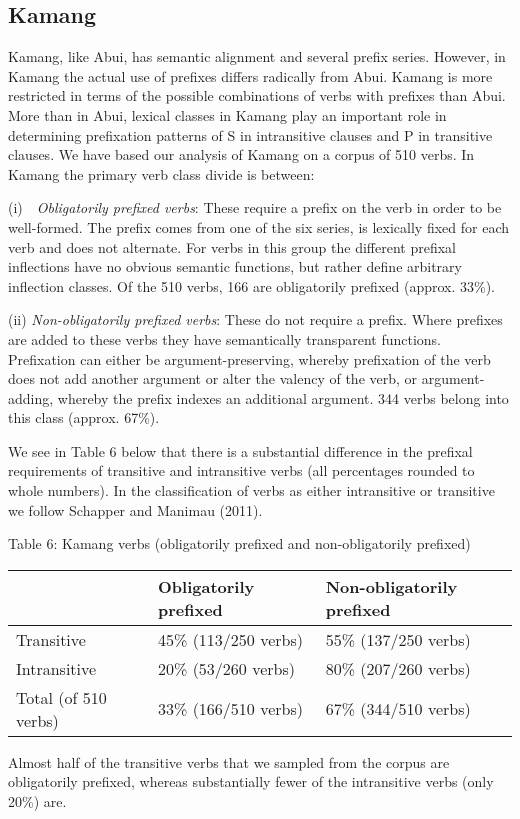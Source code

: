 \subsection[Kamang]{Kamang}
Kamang, like Abui, has semantic alignment and several prefix series. However, in Kamang the actual use of prefixes differs radically from Abui. Kamang is more restricted in terms of the possible combinations of verbs with prefixes than Abui. More than in Abui, lexical classes in Kamang play an important role in determining prefixation patterns of S in intransitive clauses and P in transitive clauses. We have based our analysis of Kamang on a corpus of 510 verbs. In Kamang the primary verb class divide is between: 

(i)\ \ \textit{Obligatorily prefixed verbs}: These require a prefix on the verb in order to be well-formed. The prefix comes from one of the six series, is lexically fixed for each verb and does not alternate. For verbs in this group the different prefixal inflections have no obvious semantic functions, but rather define arbitrary inflection classes. Of the 510 verbs, 166 are obligatorily prefixed (approx. 33\%).

(ii) \textit{Non-obligatorily prefixed verbs}: These do not require a prefix. Where prefixes are added to these verbs they have semantically transparent functions. Prefixation can either be argument-preserving, whereby prefixation of the verb does not add another argument or alter the valency of the verb, or argument-adding, whereby the prefix indexes an additional argument. 344 verbs belong into this class (approx. 67\%).

We see in Table 6 below that there is a substantial difference in the prefixal requirements of transitive and intransitive verbs (all percentages rounded to whole numbers). In the classification of verbs as either intransitive or transitive we follow Schapper and Manimau (2011).

Table 6: Kamang verbs (obligatorily prefixed and non-obligatorily prefixed)

\begin{flushleft}
\tablehead{}
\begin{supertabular}{|m{1.7518599in}|m{2.3295598in}|m{2.1004598in}|}
\hline
 &
Obligatorily prefixed &
Non-obligatorily prefixed\\\hline
Transitive &
45\% (113/250 verbs) &
55\% (137/250 verbs)\\\hline
Intransitive  &
20\% (53/260 verbs) &
80\% (207/260 verbs)\\\hline
Total (of 510 verbs) &
33\% (166/510 verbs) &
67\% (344/510 verbs)\\\hline
\end{supertabular}
\end{flushleft}
Almost half of the transitive verbs that we sampled from the corpus are obligatorily prefixed, whereas substantially fewer of the intransitive verbs (only 20\%) are. 

